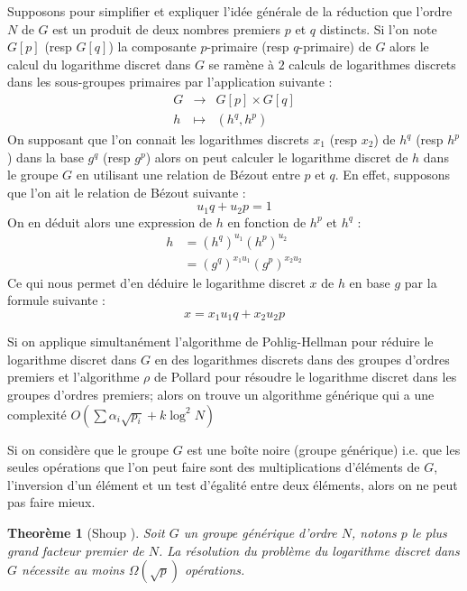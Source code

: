 \documentclass[a4paper]{article}
\newtheorem{theoreme}{Theorème}[section]
\theoremstyle{definition}
\theoremstyle{remark}
\numberwithin{equation}{section}
\begin{document}
Supposons pour simplifier et expliquer l'idée générale de la réduction que l'ordre $N$ de $G$ est un produit de deux nombres premiers $p$ et $q$ distincts. Si l'on note $G[p]$ (resp $G[q]$) la composante $p$-primaire (resp $q$-primaire) de $G$ alors le calcul du logarithme discret dans $G$ se ramène à $2$ calculs de logarithmes discrets dans les sous-groupes primaires par l'application suivante :
\begin{equation*}
\begin{array}{lcl}
G & \longrightarrow & G[p] \times G[q] \\
h & \longmapsto & (h^q, h^p)
\end{array}
\end{equation*}
On supposant que l'on connait les logarithmes discrets $x_1$ (resp $x_2$) de $h^q$ (resp $h^p$) dans la base $g^q$ (resp $g^p$) alors on peut calculer le logarithme discret de $h$ dans le groupe $G$ en utilisant une relation de Bézout entre $p$ et $q$. En effet, supposons que l'on ait le relation de Bézout suivante :
$$u_1 q + u_2 p = 1$$
On en déduit alors une expression de $h$ en fonction de $h^p$ et $h^q$ :
\begin{align*}
h &= (h^q)^{u_1}(h^p)^{u_2} \\
  &= (g^q)^{x_1u_1}(g^p)^{x_2u_2}
\end{align*}
Ce qui nous permet d'en déduire le logarithme discret $x$ de $h$ en base $g$ par la formule suivante :
$$x = x_1 u_1 q + x_2 u_2 p$$

Si on applique simultanément l'algorithme de Pohlig-Hellman pour réduire le logarithme discret dans $G$ en des logarithmes discrets dans des groupes d'ordres premiers et l'algorithme $\rho$ de Pollard pour résoudre le logarithme discret dans les groupes d'ordres premiers; alors on trouve un algorithme générique qui a une complexité $O(\sum{\alpha_i\sqrt{p_i}}+k\log^2 N)$

Si on considère que le groupe $G$ est une boîte noire (groupe générique) i.e. que les seules opérations que l'on peut faire sont des multiplications d'éléments de $G$, l'inversion d'un élément et un test d'égalité entre deux éléments, alors on ne peut pas faire mieux.

\begin{theoreme}[Shoup \cite{shoup}]
Soit $G$ un groupe générique d'ordre $N$, notons $p$ le plus grand facteur premier de $N$. La résolution du problème du logarithme discret dans $G$ nécessite au moins $\Omega(\sqrt{p})$ opérations. 
\end{theoreme}
\end{document}
